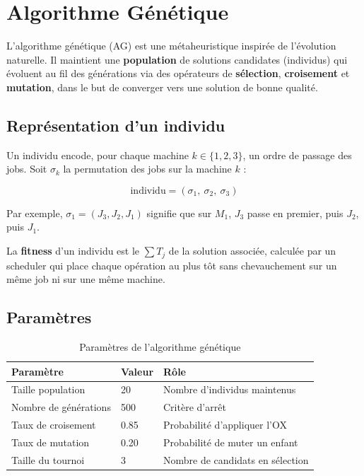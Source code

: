 \section{Algorithme Génétique}

L'algorithme génétique (AG) est une métaheuristique inspirée de l'évolution naturelle. Il maintient une \textbf{population} de solutions candidates (individus) qui évoluent au fil des générations via des opérateurs de \textbf{sélection}, \textbf{croisement} et \textbf{mutation}, dans le but de converger vers une solution de bonne qualité.

\subsection{Représentation d'un individu}

Un individu encode, pour chaque machine $k \in \{1, 2, 3\}$, un ordre de passage des jobs. Soit $\sigma_k$ la permutation des jobs sur la machine $k$ :

\[
\text{individu} = (\sigma_1,\ \sigma_2,\ \sigma_3)
\]

Par exemple, $\sigma_1 = (J_3, J_2, J_1)$ signifie que sur $M_1$, $J_3$ passe en premier, puis $J_2$, puis $J_1$.

La \textbf{fitness} d'un individu est le $\sum T_j$ de la solution associée, calculée par un scheduler qui place chaque opération au plus tôt sans chevauchement sur un même job ni sur une même machine.

\subsection{Paramètres}

\begin{table}[H]
\centering
\begin{tabular}{lll}
\toprule
\textbf{Paramètre} & \textbf{Valeur} & \textbf{Rôle} \\
\midrule
Taille population & 20 & Nombre d'individus maintenus \\
Nombre de générations & 500 & Critère d'arrêt \\
Taux de croisement & 0.85 & Probabilité d'appliquer l'OX \\
Taux de mutation & 0.20 & Probabilité de muter un enfant \\
Taille du tournoi & 3 & Nombre de candidats en sélection \\
\bottomrule
\end{tabular}
\caption{Paramètres de l'algorithme génétique}
\end{table}


